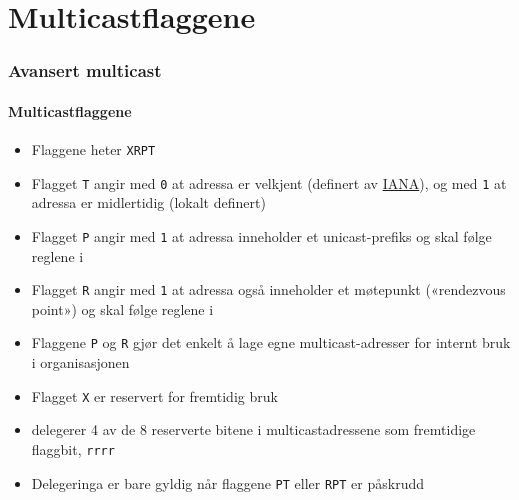 \section{Multicastflaggene}
\begin{frame}
  \frametitle{Avansert multicast}
  \framesubtitle{Multicastflaggene}
  \begin{itemize}
  \item Flaggene heter \texttt{XRPT} 
  \item Flagget \texttt{T} angir med \texttt{0} at adressa er velkjent
    (definert av \href{http://www.iana.org/}{IANA}), og med \texttt{1}
    at adressa er midlertidig (lokalt definert)
  \item Flagget \texttt{P} angir med \texttt{1} at adressa inneholder
    et unicast-prefiks og skal følge reglene i 
  \item Flagget \texttt{R} angir med \texttt{1} at adressa også
    inneholder et møtepunkt («rendezvous point») og skal følge reglene
    i 
  \item Flaggene \texttt{P} og \texttt{R} gjør det enkelt å lage egne
    multicast-adresser for internt bruk i organisasjonen
  \item Flagget \texttt{X} er reservert for fremtidig bruk
  \item {} delegerer 4 av de 8 reserverte bitene i
    multicastadressene som fremtidige flaggbit, \texttt{rrrr}
  \item Delegeringa er bare gyldig når flaggene \texttt{PT} eller
    \texttt{RPT} er påskrudd
  \end{itemize}
\end{frame}

